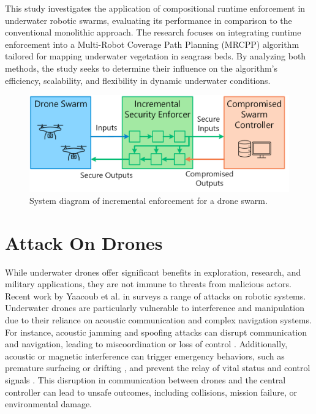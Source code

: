 \noindent This study investigates the application of compositional runtime enforcement in underwater robotic swarms, evaluating its performance in comparison to the conventional monolithic approach. The research focuses on integrating runtime enforcement into a Multi-Robot Coverage Path Planning (MRCPP) algorithm tailored for mapping underwater vegetation in seagrass beds. By analyzing both methods, the study seeks to determine their influence on the algorithm's efficiency, scalability, and flexibility in dynamic underwater conditions.

\begin{figure}[htb]
	\centering
	\includegraphics[width=0.94\linewidth]{fig/drone-system2.png}
	\caption{System diagram of incremental enforcement for a drone swarm.}
	\label{fig:drone-system}
\end{figure} 


\section{Attack On Drones}
\label{AttackOnDrones}

While underwater drones offer significant benefits in exploration, research, and military applications, they are not immune to threats from malicious actors. Recent work by Yaacoub et al. in \cite{yaacoub2020security} surveys a range of attacks on robotic systems. Underwater drones are particularly vulnerable to interference and manipulation due to their reliance on acoustic communication and complex navigation systems. For instance, acoustic jamming and spoofing attacks can disrupt communication and navigation, leading to miscoordination or loss of control \cite{westerlund2019drone}. Additionally, acoustic or magnetic interference can trigger emergency behaviors, such as premature surfacing or drifting \cite{Abunada2020}, and prevent the relay of vital status and control signals \cite{Valianti2021}. This disruption in communication between drones and the central controller can lead to unsafe outcomes, including collisions, mission failure, or environmental damage.

